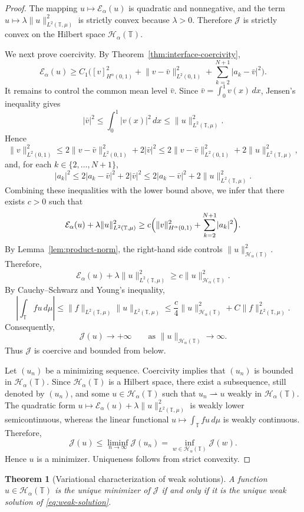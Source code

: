 \documentclass[11pt]{article}
\numberwithin{equation}{section}
\newtheorem{theorem}{Theorem}[section]
\theoremstyle{definition}
\newcommand{\T}{\mathbb{T}}
\newcommand{\EE}{\mathcal{E}}
\newcommand{\JJ}{\mathcal{J}}
\newcommand{\HH}{\mathcal{H}}
\newcommand{\ddmu}{\,d\mu}
\newcommand{\abs}[1]{\lvert#1\rvert}
\newcommand{\norm}[1]{\lVert#1\rVert}
\begin{document}
\begin{proof}
The mapping $u\mapsto \EE_\alpha(u)$ is quadratic and nonnegative, and the term $u\mapsto \lambda\norm{u}_{L^2(\T,\mu)}^2$ is strictly convex because $\lambda>0$. Therefore $\JJ$ is strictly convex on the Hilbert space $\HH_\alpha(\T)$.

We next prove coercivity. By Theorem~\ref{thm:interface-coercivity},
\[
\EE_\alpha(u)\ge C_1\Big(
[v]_{H^\alpha(0,1)}^2
+\norm{v-\bar v}_{L^2(0,1)}^2
+\sum_{k=2}^{N+1}\abs{a_k-\bar v}^2
\Big).
\]
It remains to control the common mean level $\bar v$. Since $\bar v=\int_0^1 v(x)\,dx$, Jensen's inequality gives
\[
\abs{\bar v}^2\le \int_0^1 \abs{v(x)}^2\,dx\le \norm{u}_{L^2(\T,\mu)}^2.
\]
Hence
\[
\norm{v}_{L^2(0,1)}^2
\le 2\norm{v-\bar v}_{L^2(0,1)}^2+2\abs{\bar v}^2
\le 2\norm{v-\bar v}_{L^2(0,1)}^2+2\norm{u}_{L^2(\T,\mu)}^2,
\]
and, for each $k\in\{2,\dots,N+1\}$,
\[
\abs{a_k}^2\le 2\abs{a_k-\bar v}^2+2\abs{\bar v}^2
\le 2\abs{a_k-\bar v}^2+2\norm{u}_{L^2(\T,\mu)}^2.
\]
Combining these inequalities with the lower bound above, we infer that there exists $c>0$ such that
\[
\EE_\alpha(u)+\lambda\norm{u}_{L^2(\T,\mu)}^2
\ge c\Bigl(\norm{v}_{H^\alpha(0,1)}^2+\sum_{k=2}^{N+1}\abs{a_k}^2\Bigr).
\]
By Lemma~\ref{lem:product-norm}, the right-hand side controls $\norm{u}_{\HH_\alpha(\T)}^2$. Therefore,
\[
\EE_\alpha(u)+\lambda\norm{u}_{L^2(\T,\mu)}^2
\ge c\norm{u}_{\HH_\alpha(\T)}^2.
\]
By Cauchy--Schwarz and Young's inequality,
\[
\left|\int_{\T}fu\ddmu\right|
\le \norm{f}_{L^2(\T,\mu)}\norm{u}_{L^2(\T,\mu)}
\le \frac{c}{4}\norm{u}_{\HH_\alpha(\T)}^2+C\norm{f}_{L^2(\T,\mu)}^2.
\]
Consequently,
\[
\JJ(u)\to +\infty\qquad\text{as }\norm{u}_{\HH_\alpha(\T)}\to\infty.
\]
Thus $\JJ$ is coercive and bounded from below.

Let $(u_n)$ be a minimizing sequence. Coercivity implies that $(u_n)$ is bounded in $\HH_\alpha(\T)$. Since $\HH_\alpha(\T)$ is a Hilbert space, there exist a subsequence, still denoted by $(u_n)$, and some $u\in\HH_\alpha(\T)$ such that $u_n\rightharpoonup u$ weakly in $\HH_\alpha(\T)$. The quadratic form $u\mapsto \EE_\alpha(u)+\lambda\norm{u}_{L^2(\T,\mu)}^2$ is weakly lower semicontinuous, whereas the linear functional $u\mapsto \int_{\T}fu\ddmu$ is weakly continuous. Therefore,
\[
\JJ(u)\le \liminf_{n\to\infty}\JJ(u_n)=\inf_{w\in\HH_\alpha(\T)}\JJ(w).
\]
Hence $u$ is a minimizer. Uniqueness follows from strict convexity.
\end{proof}

\begin{theorem}[Variational characterization of weak solutions]\label{thm:weak-var-equivalence}
A function $u\in\HH_\alpha(\T)$ is the unique minimizer of $\JJ$ if and only if it is the unique weak solution of \eqref{eq:weak-solution}.
\end{theorem}
\end{document}
